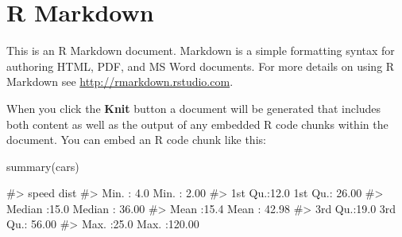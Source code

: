 \chapter{R Markdown}

This is an R Markdown document. Markdown is a simple formatting syntax
for authoring HTML, PDF, and MS Word documents. For more details on
using R Markdown see \url{http://rmarkdown.rstudio.com}.

When you click the \textbf{Knit} button a document will be generated
that includes both content as well as the output of any embedded R code
chunks within the document. You can embed an R code chunk like this:

\begin{Schunk}
\begin{Sinput}
summary(cars)
\end{Sinput}
\begin{Soutput}
#>      speed           dist       
#>  Min.   : 4.0   Min.   :  2.00  
#>  1st Qu.:12.0   1st Qu.: 26.00  
#>  Median :15.0   Median : 36.00  
#>  Mean   :15.4   Mean   : 42.98  
#>  3rd Qu.:19.0   3rd Qu.: 56.00  
#>  Max.   :25.0   Max.   :120.00
\end{Soutput}
\end{Schunk}

\address{
Your R. Name\\
\\
\\
}


